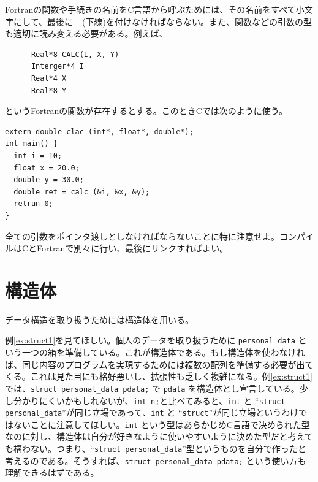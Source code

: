 Fortranの関数や手続きの名前をC言語から呼ぶためには、その名前をすべて小文字にして、最後に\_ (下線)を付けなければならない。また、関数などの引数の型も適切に読み変える必要がある。例えば、
\begin{reidai}
\begin{verbatim}
      Real*8 CALC(I, X, Y)
      Interger*4 I
      Real*4 X
      Real*8 Y
\end{verbatim}
\end{reidai} \noindent
というFortranの関数が存在するとする。このときCでは次のように使う。
\begin{reidai}
\begin{verbatim}
extern double clac_(int*, float*, double*);
int main() {
  int i = 10;
  float x = 20.0;
  double y = 30.0;
  double ret = calc_(&i, &x, &y);
  retrun 0;
}
\end{verbatim}
\end{reidai} \noindent
全ての引数をポインタ渡しとしなければならないことに特に注意せよ。コンパイルはCとFortranで別々に行い、最後にリンクすればよい。

\section{構造体}
データ構造を取り扱うためには構造体を用いる。

例\ref{ex:struct1}を見てほしい。個人のデータを取り扱うために \verb|personal_data| という一つの箱を準備している。これが構造体である。もし構造体を使わなければ、同じ内容のプログラムを実現するためには複数の配列を準備する必要が出てくる。これは見た目にも格好悪いし、拡張性も乏しく複雑になる。例\ref{ex:struct1}では、\verb|struct personal_data pdata;| で \verb|pdata| を構造体とし宣言している。少し分かりにくいかもしれないが、\verb|int n;|と比べてみると、\verb|int| と ``\verb|struct personal_data|''が同じ立場であって、\verb|int| と ``\verb|struct|''が同じ立場というわけではないことに注意してほしい。\verb|int| という型はあらかじめC言語で決められた型なのに対し、構造体は自分が好きなように使いやすいように決めた型だと考えても構わない。つまり、``\verb|struct personal_data|''型というものを自分で作ったと考えるのである。そうすれば、\verb|struct personal_data pdata;| という使い方も理解できるはずである。


